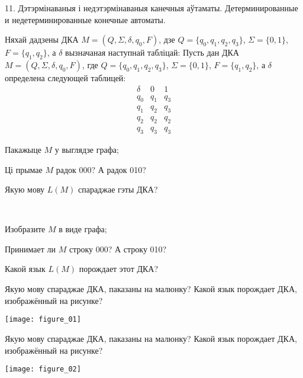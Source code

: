 \documentclass[12pt, a4paper]{article}
\begin{document}
\biLangHeader
{11. Дэтэрмінаваныя і недэтэрмінаваныя канечныя аўтаматы.}
{Детерминированные и недетерминированные конечные автоматы.}

\begin{problemList}

\problemItemWithCommonPartComplicated
{Няхай дадзены ДКА $M=(Q, \Sigma, \delta, q_0, F)$,
дзе $Q=\{q_0, q_1, q_2, q_3\}$, $\Sigma=\{0, 1\}$, $F=\{q_1, q_2\}$, а $\delta$ вызначаная наступнай табліцай:}
{Пусть дан ДКА $M=(Q, \Sigma, \delta, q_0, F)$,
где $Q=\{q_0, q_1, q_2, q_3\}$, $\Sigma=\{0, 1\}$, $F=\{q_1, q_2\}$, а $\delta$ определена следующей таблицей:}
{%
\[
\begin{matrix}
\delta & 0 & 1 \\
q_0 & q_1 & q_3 \\
q_1 & q_2 & q_3 \\
q_2 & q_2 & q_2 \\
q_3 & q_3 & q_3	
\end{matrix}
\]
}
{%
\begin{belarusianEnumerate}
    \item Пакажыце $M$ у выглядзе графа;
    \item Ці прымае $M$ радок 000? А радок 010?
    \item Якую мову $L(M)$ спараджае гэты ДКА? 
\end{belarusianEnumerate}\\[-15pt]
}
{%
\begin{russianEnumerate}
    \item Изобразите $M$ в виде графа;
    \item Принимает ли $M$ строку 000? А строку 010?
    \item Какой язык $L(M)$ порождает этот ДКА? 
\end{russianEnumerate}
}

\bigskip

\problemItemWithCommonPart
{Якую мову спараджае ДКА, паказаны на малюнку?}
{Какой язык порождает ДКА, изображённый на рисунке?}
{%
\begin{center}
    \texttt{[image: figure\_01]}
\end{center}
}

\problemItemWithCommonPart
{Якую мову спараджае ДКА, паказаны на малюнку?}
{Какой язык порождает ДКА, изображённый на рисунке?}
{%
\begin{center}
    \texttt{[image: figure\_02]}
\end{center}
}


\end{problemList}
\end{document}
